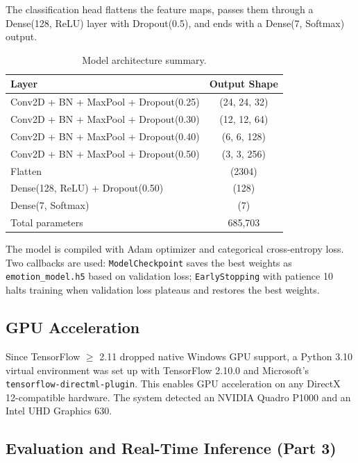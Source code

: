 \documentclass[12pt,a4paper]{article}
\begin{document}
The classification head flattens the feature maps, passes them through a Dense(128, ReLU) layer with Dropout(0.5), and ends with a Dense(7, Softmax) output.

\begin{table}[H]
    \centering
    \caption{Model architecture summary.}
    \label{tab:architecture}
    \begin{tabular}{lc}
        \toprule
        Layer & Output Shape \\
        \midrule
        Conv2D + BN + MaxPool + Dropout(0.25) & (24, 24, 32) \\
        Conv2D + BN + MaxPool + Dropout(0.30) & (12, 12, 64) \\
        Conv2D + BN + MaxPool + Dropout(0.40) & (6, 6, 128) \\
        Conv2D + BN + MaxPool + Dropout(0.50) & (3, 3, 256) \\
        Flatten & (2304) \\
        Dense(128, ReLU) + Dropout(0.50) & (128) \\
        Dense(7, Softmax) & (7) \\
        \midrule
        Total parameters & 685,703 \\
        \bottomrule
    \end{tabular}
\end{table}

The model is compiled with Adam optimizer and categorical cross-entropy loss. Two callbacks are used: \texttt{ModelCheckpoint} saves the best weights as \texttt{emotion\_model.h5} based on validation loss; \texttt{EarlyStopping} with patience 10 halts training when validation loss plateaus and restores the best weights.

\subsection{GPU Acceleration}
Since TensorFlow $\geq$ 2.11 dropped native Windows GPU support, a Python 3.10 virtual environment was set up with TensorFlow 2.10.0 and Microsoft's \texttt{tensorflow-directml-plugin}. This enables GPU acceleration on any DirectX 12-compatible hardware. The system detected an NVIDIA Quadro P1000 and an Intel UHD Graphics 630.

\subsection{Evaluation and Real-Time Inference (Part 3)}
\end{document}
